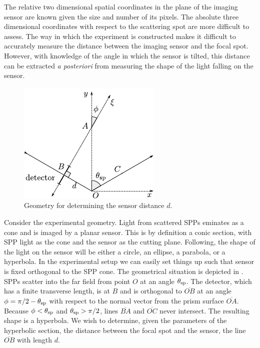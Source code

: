 The relative two dimensional spatial coordinates in the plane of the
imaging sensor are known given the size and number of its pixels.  The
absolute three dimensional coordinates with respect to the scattering spot
are more difficult to assess.  The way in which the experiment is
constructed makes it difficult to accurately measure the distance between
the imaging sensor and the focal spot.  However, with knowledge of the
angle in which the sensor is tilted, this distance can be extracted
\textit{a posteriori} from measuring the shape of the light falling on the
sensor.
\begin{figure}[ht]
\centering
\includegraphics[keepaspectratio,scale=1.25]{figures/hyperbolageoa.pdf}
\caption{Geometry for determining the sensor distance $d$.}
\label{fig:propgeo}
\end{figure}

Consider the experimental geometry.  Light from scattered SPPs eminates as
a cone and is imaged by a planar sensor.  This is by definition a conic
section, with SPP light as the cone and the sensor as the cutting
plane.  Following, the shape of the light on the sensor will be either a
circle, an ellipse, a parabola, or a hyperbola.  In the experimental setup
we can easily set things up such that sensor is fixed
orthogonal to the SPP cone.  The geometrical situation is depicted in
.  SPPs scatter into the far field from point $O$ at an
angle $\theta_\mathrm{sp}$.  The detector, which has a finite transverse length, is at $B$ and is
orthogonal to $\overline{OB}$ at an angle $\phi=\pi/2-\theta_\mathrm{sp}$ with respect to
the normal vector from the prism surface $\overline{OA}$.  Because
$\phi<\theta_\mathrm{sp}$ and $\theta_\mathrm{sp}>\pi/2$, lines $\overline{BA}$ and $\overline{OC}$ never
intersect. The resulting shape is a hyperbola.  We wish to determine, given
the parameters of the hyperbolic section, the distance between the focal
spot and the sensor, the line $\overline{OB}$ with length $d$.  

